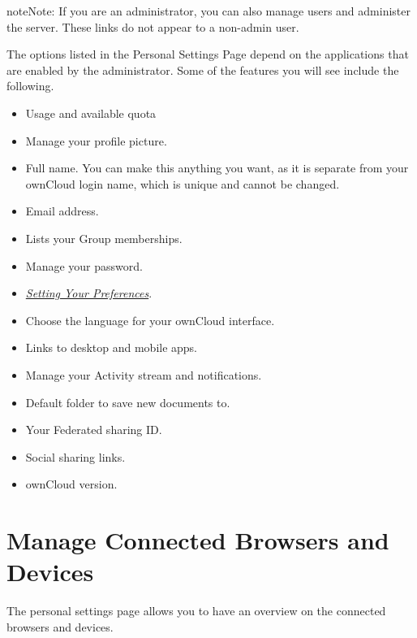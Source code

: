 \documentclass[letterpaper,10pt,english]{sphinxmanual}
\begin{document}
\begin{notice}{note}{Note:}
If you are an administrator, you can also manage users and administer
the server. These links do not appear to a non-admin user.
\end{notice}

The options listed in the Personal Settings Page depend on the applications that
are enabled by the administrator.  Some of the features you will see
include the following.
\begin{itemize}
\item {} 
Usage and available quota

\item {} 
Manage your profile picture.

\item {} 
Full name. You can make this anything you want, as it is separate from your
ownCloud login name, which is unique and cannot be changed.

\item {} 
Email address.

\item {} 
Lists your Group memberships.

\item {} 
Manage your password.

\item {} 
{\hyperref[userpreferences::doc]{\emph{\emph{Setting Your Preferences}}}}.

\item {} 
Choose the language for your ownCloud interface.

\item {} 
Links to desktop and mobile apps.

\item {} 
Manage your Activity stream and notifications.

\item {} 
Default folder to save new documents to.

\item {} 
Your Federated sharing ID.

\item {} 
Social sharing links.

\item {} 
ownCloud version.

\end{itemize}


\chapter{Manage Connected Browsers and Devices}
\label{session_management:manage-connected-browsers-and-devices}\label{session_management::doc}
The personal settings page allows you to have an overview on the connected
browsers and devices.
\end{document}
